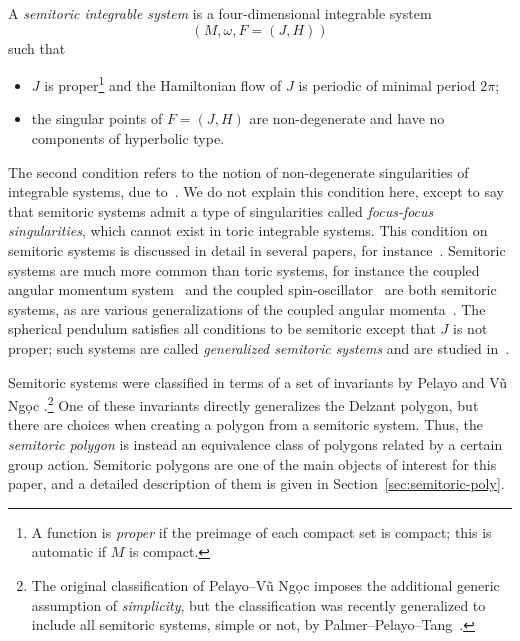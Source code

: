 \documentclass[10pt,a4paper]{amsart}
\numberwithin{equation}{section}
\newcommand{\om}{\omega}
\theoremstyle{definition}
\theoremstyle{plain}
\theoremstyle{plain}
\begin{document}
\begin{Definition} \label{def:semitoricsystem}
A \emph{semitoric integrable system} is a four-dimensional integrable system \[(M,\om,F=(J,H))\] such that
\begin{itemize}\itemsep=0pt
 \item $J$ is proper\footnote{A function is \emph{proper} if the preimage of each compact set is compact; this is automatic if $M$ is compact.} and the Hamiltonian flow of $J$ is periodic of minimal period $2\pi$;
 \item the singular points of $F=(J,H)$ are non-degenerate and have no components of hyperbolic type.
\end{itemize}
\end{Definition}

The second condition refers to the notion of non-degenerate singularities of integrable systems, due to~\cite{Bolsinov-Fomenko}.
We do not explain this condition here, except to say that semitoric systems admit a type of singularities called \emph{focus-focus singularities}, which cannot exist in toric integrable systems. This condition on semitoric systems is discussed in detail in several papers, for instance~\cite[Sections 2.1--2.4]{LFPal}.
Semitoric systems are much more common than toric systems, for instance the coupled angular momentum system~\cite{ADH-momenta,LFP,SaZh1999} and the coupled spin-oscillator~\cite{ADH-spin-osc,PVN-spin-osc} are both semitoric systems, as are various generalizations of the coupled angular momenta~\cite{AHP-twist,HoPa2017}.
The spherical pendulum satisfies all conditions to be semitoric except that $J$ is not proper; such systems are called \emph{generalized semitoric systems} and are studied in~\cite{PeRaVN2015}.

Semitoric systems were classified in terms of a set of invariants by Pelayo and V\~{u} Ng\d{o}c \cite{PeVN2009,PeVN2011}.\footnote{The original classification of Pelayo--V\~{u} Ng\d{o}c imposes the additional generic assumption of \emph{simplicity}, but the classification was recently generalized to include all semitoric systems, simple or not, by Palmer--Pelayo--Tang~\cite{PPT-nonsimple}.}
One of these invariants directly generalizes the Delzant polygon, but there are choices when creating a polygon from a semitoric system. Thus, the \emph{semitoric polygon} is instead an equivalence class of polygons related by a certain group action.
Semitoric polygons are one of the main objects of interest for this paper, and a detailed description of them is given in Section~\ref{sec:semitoric-poly}.
\end{document}
